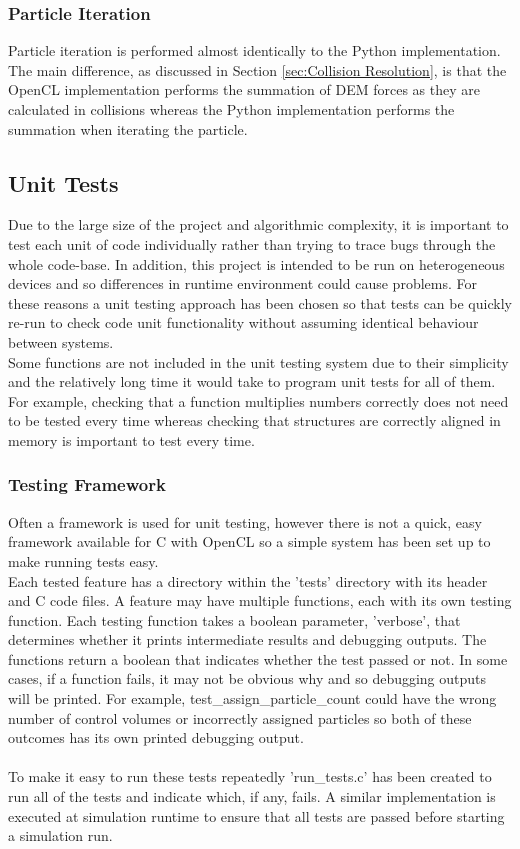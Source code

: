 \documentclass[a4paper,11pt,titlepage]{report}
\begin{document}
\subsubsection{Particle Iteration}
Particle iteration is performed almost identically to the Python implementation. The main difference, as discussed in Section \ref{sec:Collision Resolution}, is that the OpenCL implementation performs the summation of DEM forces as they are calculated in collisions whereas the Python implementation performs the summation when iterating the particle.
\subsection{Unit Tests}
Due to the large size of the project and algorithmic complexity, it is important to test each unit of code individually rather than trying to trace bugs through the whole code-base. In addition, this project is intended to be run on heterogeneous devices and so differences in runtime environment could cause problems. For these reasons a unit testing approach has been chosen so that tests can be quickly re-run to check code unit functionality without assuming identical behaviour between systems.
\\Some functions are not included in the unit testing system due to their simplicity and the relatively long time it would take to program unit tests for all of them. For example, checking that a function multiplies numbers correctly does not need to be tested every time whereas checking that structures are correctly aligned in memory is important to test every time.
\subsubsection{Testing Framework}
Often a framework is used for unit testing, however there is not a quick, easy framework available for C with OpenCL so a simple system has been set up to make running tests easy.
\\Each tested feature has a directory within the 'tests' directory with its header and C code files. A feature may have multiple functions, each with its own testing function. Each testing function takes a boolean parameter, 'verbose', that determines whether it prints intermediate results and debugging outputs. The functions return a boolean that indicates whether the test passed or not. In some cases, if a function fails, it may not be obvious why and so debugging outputs will be printed. For example, test\_assign\_particle\_count could have the wrong number of control volumes or incorrectly assigned particles so both of these outcomes has its own printed debugging output.
\\\\To make it easy to run these tests repeatedly 'run\_tests.c' has been created to run all of the tests and indicate which, if any, fails. A similar implementation is executed at simulation runtime to ensure that all tests are passed before starting a simulation run.
\end{document}
